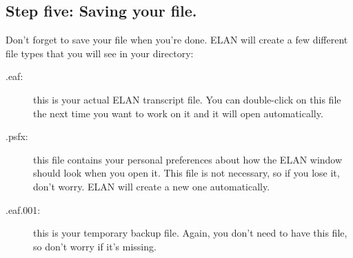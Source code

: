 \documentclass[letterpaper,12pt]{article}
\begin{document}
\subsection*{Step five: Saving your file.}

Don't forget to save your file when you're done. ELAN will create a few different file types that you will see in your directory:
\begin{description}
\item[.eaf:] this is your actual ELAN transcript file. You can double-click on this file the next time you want to work on it and it will open automatically.
\item[.psfx:] this file contains your personal preferences about how the ELAN window should look when you open it. This file is not necessary, so if you lose it, don't worry. ELAN will create a new one automatically.
\item[.eaf.001:] this is your temporary backup file. Again, you don't need to have this file, so don't worry if it's missing.
\end{description}
\end{document}
